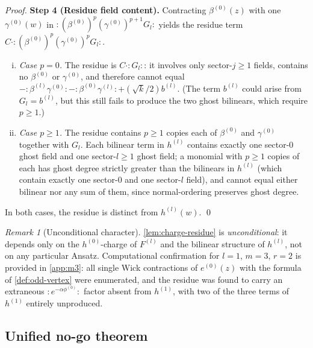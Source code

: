 \documentclass[12pt]{article}
\theoremstyle{plain}
\theoremstyle{definition}
\theoremstyle{remark}
\newtheorem{remark}[theorem]{Remark}
\newcommand{\bl}[1]{\beta^{(#1)}}
\newcommand{\gl}[1]{\gamma^{(#1)}}
\newcommand{\el}[1]{e^{(#1)}}
\newcommand{\hl}[1]{h^{(#1)}}
\newcommand{\no}[1]{:\!#1\!:}
\begin{document}
\begin{proof}
  \textbf{Step 4 (Residue field content).}
  Contracting $\bl{0}(z)$ with one $\gl{0}(w)$ in $\no{(\bl{0})^p(\gl{0})^{p+1}G_l}$
  yields the residue term $C\cdot\no{(\bl{0})^p(\gl{0})^p G_l}$.
  \begin{enumerate}[(i)]
    \item \emph{Case $p=0$.} The residue is $C\cdot\no{G_l}$: it involves only
      sector-$j\geq 1$ fields, contains no $\bl{0}$ or $\gl{0}$, and therefore
      cannot equal $-\no{\bl{l}\gl{0}}-\no{\bl{0}\gl{l}}+({\sqrt{k}}/{2})b^{(l)}$.
      (The term $b^{(l)}$ could arise from $G_l=b^{(l)}$, but this still fails
      to produce the two ghost bilinears, which require $p\geq 1$.)
    \item \emph{Case $p\geq 1$.} The residue contains $p\geq 1$ copies each of
      $\bl{0}$ and $\gl{0}$ together with $G_l$.  Each bilinear term in $\hl{l}$
      contains exactly one sector-$0$ ghost field and one sector-$l\geq 1$ ghost
      field; a monomial with $p\geq 1$ copies of each has ghost degree strictly
      greater than the bilinears in $\hl{l}$ (which contain exactly one sector-$0$
      and one sector-$l$ field), and cannot equal either bilinear nor any sum of
      them, since normal-ordering preserves ghost degree.
  \end{enumerate}
  In both cases, the residue is distinct from $\hl{l}(w)$. \qed
\end{proof}

\begin{remark}[Unconditional character]
\label{rem:unconditional}
  \cref{lem:charge-residue} is \emph{unconditional}: it depends only on the
  $h^{(0)}$-charge of $F^{(l)}$ and the bilinear structure of $\hl{l}$,
  not on any particular Ansatz.
  Computational confirmation for $l=1$, $m=3$, $r=2$ is provided in \cref{app:m3}:
  all single Wick contractions of $\el{0}(z)$ with the formula of \cref{def:odd-vertex}
  were enumerated, and the residue was found to carry an extraneous
  $\no{e^{-\alpha\phi^{(0)}}}$ factor absent from $\hl{1}$,
  with two of the three terms of $\hl{1}$ entirely unproduced.
\end{remark}

\subsection{Unified no-go theorem}
\label{subsec:unified-nogo}
\end{document}
